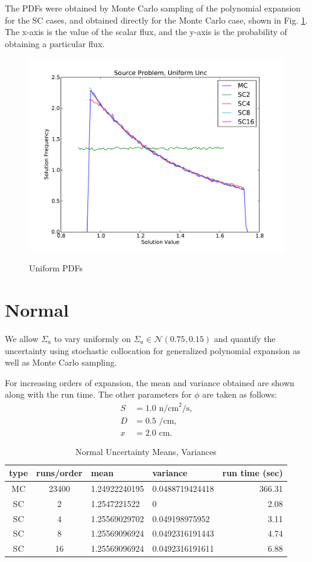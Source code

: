 \documentclass[11pt]{article} %
\begin{document}
The PDFs were obtained by Monte Carlo sampling of the polynomial expansion for the SC cases, and obtained directly for the Monte Carlo case, shown in Fig. \ref{uni}.  The x-axis is the value of the scalar flux, and the y-axis is the probability of obtaining a particular flux.
\begin{figure}[h!]
\centering
   \includegraphics[width=\textwidth]{../graphics/source_uniform_pdfs}
   \label{uni}
   \caption{Uniform PDFs}
\end{figure}


\newpage
\section{Normal}
We allow $\Sigma_a$ to vary uniformly on $\Sigma_a\in\mathcal{N}(0.75,0.15)$ and quantify the uncertainty using stochastic collocation for generalized polynomial expansion as well as Monte Carlo sampling.

For increasing orders of expansion, the mean and variance obtained are shown along with the run time.  The other parameters for $\phi$ are taken as follows:
\begin{align}
S &= 1.0 \text{ n/cm}^2\text{/s},\\
D &= 0.5 \text{ /cm},\\
x &= 2.0 \text{ cm}.
\end{align}
\begin{table}[h!]
\begin{center}
\begin{tabular}{c c|l l| r}
type & runs/order & mean & variance & run time (sec) \\ \hline
MC & 23400 & 1.24922240195 & 0.0488719424418 & 366.31\\
SC & 2 & 1.2547221522 & 0 & 2.08 \\
SC & 4 & 1.25569029702 & 0.049198975952 & 3.11 \\
SC & 8 & 1.25569096924 & 0.0492316191443 & 4.74\\
SC & 16 & 1.25569096924 & 0.0492316191611 & 6.88
\end{tabular}
\end{center}
\caption{Normal Uncertainty Means, Variances}
\end{table}
\end{document}
